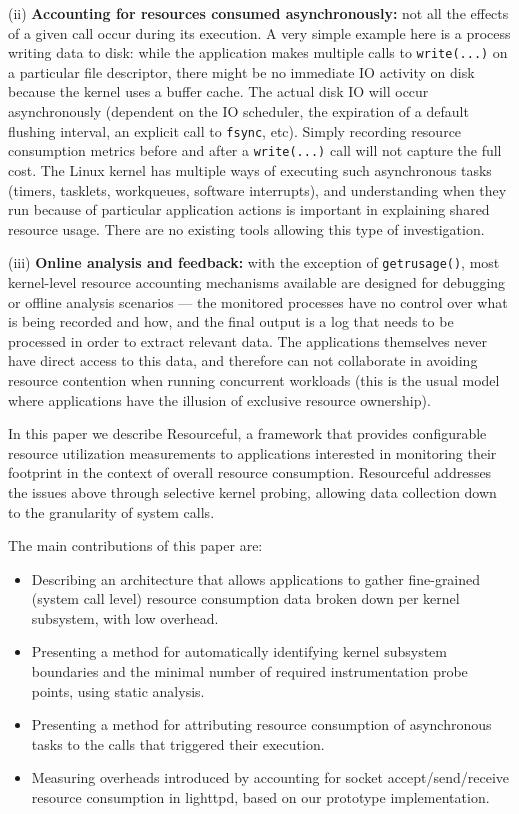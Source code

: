 \documentclass[letterpaper,twocolumn,10pt]{article}
\newcommand{\pname}{Resourceful}
\begin{document}
(ii) \textbf{Accounting for resources consumed asynchronously:} not all the
effects of a given call occur during its execution. A very simple example here
is a process writing data to disk: while the application makes multiple calls to
\texttt{write(...)} on a particular file descriptor, there might be no immediate
IO activity on disk because the kernel uses a buffer cache. The actual disk IO
will occur asynchronously (dependent on the IO scheduler, the expiration of a
default flushing interval, an explicit call to \texttt{fsync}, etc). Simply
recording resource consumption metrics before and after a \texttt{write(...)}
call will not capture the full cost. The Linux kernel has multiple ways of
executing such asynchronous tasks (timers, tasklets, workqueues, software
interrupts), and understanding when they run because of particular application
actions is important in explaining shared resource usage. There are no existing
tools allowing this type of investigation.

(iii) \textbf{Online analysis and feedback:} with the exception of
\texttt{getrusage()}, most kernel-level resource accounting mechanisms available
are designed for debugging or offline analysis scenarios --- the monitored
processes have no control over what is being recorded and how, and the final
output is a log that needs to be processed in order to extract relevant data.
The applications themselves never have direct access to this data, and therefore
can not collaborate in avoiding resource contention when running concurrent
workloads (this is the usual model where applications have the illusion of
exclusive resource ownership).

In this paper we describe \pname, a framework that provides configurable
resource utilization measurements to applications interested in monitoring their
footprint in the context of overall resource consumption. \pname{ }addresses
the issues above through selective kernel probing, allowing data collection
down to the granularity of system calls. 

The main contributions of this paper are: 

\begin{itemize} 
\item Describing an architecture that allows applications to gather fine-grained
(system call level) resource consumption data broken down per kernel subsystem,
with low overhead.
\item Presenting a method for automatically identifying kernel subsystem
boundaries and the minimal number of required instrumentation probe points,
using static analysis.
\item Presenting a method for attributing resource consumption of asynchronous
tasks to the calls that triggered their execution.
\item Measuring overheads introduced by accounting for socket
accept/send/receive resource consumption in lighttpd, based on our prototype
implementation.
\end{itemize}
\end{document}
